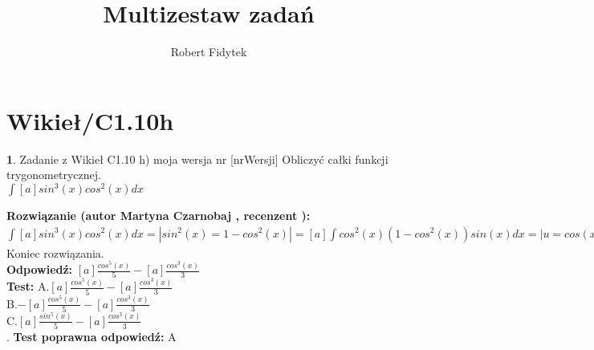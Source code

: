 \documentclass[12pt, a4paper]{article}
\title{Multizestaw zadań}
\author{Robert Fidytek}
\date{}
\theoremstyle{definition} %
\newtheorem{zad}{}
\newcommand{\kategoria}[1]{\section{#1}} %
\newcommand{\zadStart}[1]{\begin{zad}#1\newline} %
\newcommand{\zadStop}{\end{zad}}   %
\newcommand{\rozwStart}[2]{\noindent \textbf{Rozwiązanie (autor #1 , recenzent #2): }\newline} %
\newcommand{\rozwStop}{\newline}                                            %
\newcommand{\odpStart}{\noindent \textbf{Odpowiedź:}\newline}    %
\newcommand{\odpStop}{\newline}                                             %
\newcommand{\testStart}{\noindent \textbf{Test:}\newline} %
\newcommand{\testStop}{\newline} %
\newcommand{\kluczStart}{\noindent \textbf{Test poprawna odpowiedź:}\newline} %
\newcommand{\kluczStop}{\newline} %
\begin{document}
\maketitle


\kategoria{Wikieł/C1.10h}
\zadStart{Zadanie z Wikieł C1.10 h) moja wersja nr [nrWersji]}
Obliczyć całki funkcji trygonometrycznej.\\
$\int [a] sin^{3}(x) cos^{2}(x) dx$\\
\zadStop
\rozwStart{Martyna Czarnobaj}{}
	$\int [a] sin^{3}(x) cos^{2}(x) dx = | sin^{2}(x) = 1 - cos^{2}(x)| = [a] \int cos^{2}(x) (1 - cos^{2}(x)) sin(x) dx = | u=cos(x), du=-sin(x) dx | = [a] \int -u^{2} (1-u^{2}) du = -[a] \int u^{2} - u^{4} du = -[a] (- \int u^{4} du + \int u^{2} du) = -[a] (-\frac{u^{5}}{5} + \frac{u^{3}}{3}) = [a]\frac{u^{5}}{5} - [a]\frac{u^{3}}{3} = [a]\frac{cos^{5}(x)}{5} - [a]\frac{cos^{3}(x)}{3}$\\ 


Koniec rozwiązania.\\
\rozwStop
\odpStart
$ [a]\frac{cos^{5}(x)}{5} - [a]\frac{cos^{3}(x)}{3}$\\
\odpStop
\testStart
A.$[a]\frac{cos^{5}(x)}{5} - [a]\frac{cos^{3}(x)}{3}$\\
B.$-[a]\frac{cos^{5}(x)}{5} - [a]\frac{cos^{3}(x)}{3}$\\
C.$[a]\frac{sin^{5}(x)}{5} - [a]\frac{cos^{3}(x)}{3}$\\
.
\testStop
\kluczStart
A
\kluczStop
\end{document}

